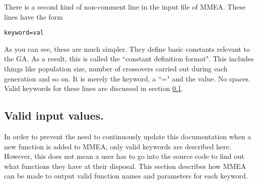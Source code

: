 \documentclass{article}
\begin{document}
There is a second kind of non-comment line in the input file of MMEA. These lines have the form
\begin{verbatim}
keyword=val
\end{verbatim}
As you can see, these are much simpler. They define basic constants relevant to the GA. As a result, this is called the ``constant definition format". This includes things like population size, number of crossovers carried out during each generation and so on. It is merely the keyword, a ``=" and the value. No spaces. Valid keywords for these lines are discussed in section \ref{input_files_valid_parameters}.

\subsection{Valid input values.}
\label{input_files_valid_parameters}
In order to prevent the need to continuously update this documentation when a new function is added to MMEA, only valid keywords are described here. However, this does not mean a user has to go into the source code to find out what functions they have at their disposal. This section describes how MMEA can be made to output valid function names and parameters for each keyword.
\end{document}
